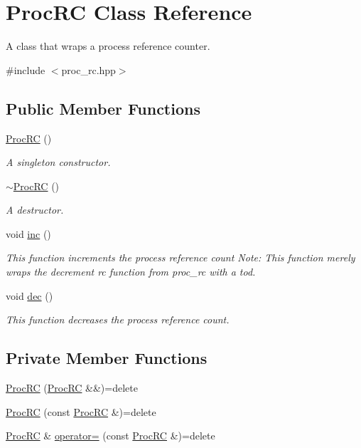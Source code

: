 \hypertarget{class_proc_r_c}{}\section{Proc\+RC Class Reference}
\label{class_proc_r_c}


A class that wraps a process reference counter.  




{\ttfamily \#include $<$proc\+\_\+rc.\+hpp$>$}

\subsection*{Public Member Functions}
\begin{DoxyCompactItemize}
\item 
\hyperlink{class_proc_r_c_aaf90e0e0b95504fda9089c6658fab53f}{Proc\+RC} ()
\begin{DoxyCompactList}\small\item\em A singleton constructor. \end{DoxyCompactList}\item 
\hyperlink{class_proc_r_c_a76d4c0e75b434d4a262cc34fc2bd7a1a}{$\sim$\+Proc\+RC} ()
\begin{DoxyCompactList}\small\item\em A destructor. \end{DoxyCompactList}\item 
void \hyperlink{class_proc_r_c_aa7512c99348dd22dd45e15b575bdd316}{inc} ()
\begin{DoxyCompactList}\small\item\em This function increments the process reference count Note\+: This function merely wraps the decrement rc function from proc\+\_\+rc with a tod. \end{DoxyCompactList}\item 
void \hyperlink{class_proc_r_c_adf71fc8726ffb2e26ed424331c12a99b}{dec} ()
\begin{DoxyCompactList}\small\item\em This function decreases the process reference count. \end{DoxyCompactList}\end{DoxyCompactItemize}
\subsection*{Private Member Functions}
\begin{DoxyCompactItemize}
\item 
\hyperlink{class_proc_r_c_a59f158e2dc9b70a8ef59753db84b81b5}{Proc\+RC} (\hyperlink{class_proc_r_c}{Proc\+RC} \&\&)=delete
\item 
\hyperlink{class_proc_r_c_a3b1ea79bd4591511fb1808d36c7493ac}{Proc\+RC} (const \hyperlink{class_proc_r_c}{Proc\+RC} \&)=delete
\item 
\hyperlink{class_proc_r_c}{Proc\+RC} \& \hyperlink{class_proc_r_c_a58ddcf9743582319b41fe2bd88e1dbc5}{operator=} (const \hyperlink{class_proc_r_c}{Proc\+RC} \&)=delete
\end{DoxyCompactItemize}
